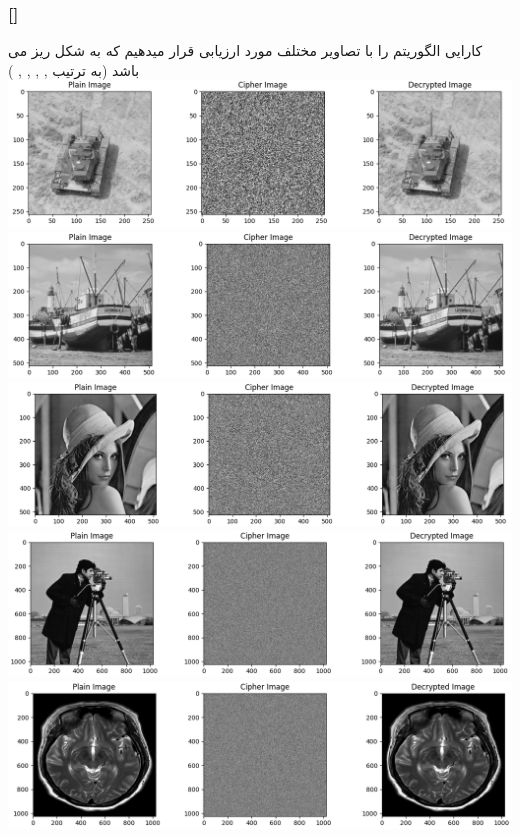 \documentclass[xcolor=dvipsnames, professionalfonts, 11pt]{beamer}
\newcommand*{\makeframetitle}{\frametitle{\insertsection \hspace{0.1em} {\footnotesize [\insertsubsection]}}}
\begin{document}
\begin{frame}[allowframebreaks]
    \makeframetitle
    کارایی الگوریتم را با تصاویر مختلف مورد ارزیابی قرار میدهیم
    که به شکل ریز می باشد (به ترتیب  , , , , )
    \includegraphics[width=\textwidth]{assets/result01.png}
    \includegraphics[width=\textwidth]{assets/result02.png}
    \includegraphics[width=\textwidth]{assets/result03.png}
    \includegraphics[width=\textwidth]{assets/result04.png}
    \includegraphics[width=\textwidth]{assets/result05.png}
\end{frame}
\end{document}
